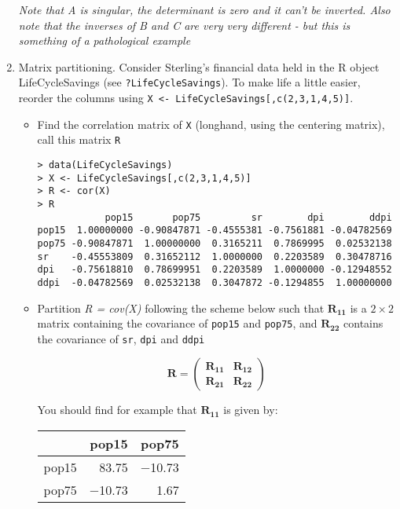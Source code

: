 \documentclass{article}
\begin{document}
\begin{enumerate}
\textit{Note that A is singular, the determinant is zero and it can't be inverted.   Also note that the inverses of B and C are very very different - but this is something of a pathological example}


\item Matrix partitioning.   Consider Sterling's financial data held in the R object LifeCycleSavings (see \texttt{?LifeCycleSavings}).   To make life a little easier, reorder the columns using \texttt{X <- LifeCycleSavings[,c(2,3,1,4,5)]}.

\begin{itemize}
\item Find the correlation matrix of \texttt{X} (longhand, using the centering matrix), call this matrix \texttt{R}

\begin{verbatim}
> data(LifeCycleSavings)
> X <- LifeCycleSavings[,c(2,3,1,4,5)]
> R <- cor(X)
> R
            pop15       pop75         sr        dpi        ddpi
pop15  1.00000000 -0.90847871 -0.4555381 -0.7561881 -0.04782569
pop75 -0.90847871  1.00000000  0.3165211  0.7869995  0.02532138
sr    -0.45553809  0.31652112  1.0000000  0.2203589  0.30478716
dpi   -0.75618810  0.78699951  0.2203589  1.0000000 -0.12948552
ddpi  -0.04782569  0.02532138  0.3047872 -0.1294855  1.00000000
\end{verbatim}

\item Partition \textit{R = cov(X)} following the scheme below such that $\boldsymbol{R_{11}}$ is a $2 \times 2$ matrix containing the covariance of \texttt{pop15} and \texttt{pop75}, and $\boldsymbol{R_{22}}$ contains the covariance of \texttt{sr}, \texttt{dpi} and \texttt{ddpi}

\begin{displaymath}
\boldsymbol{R} = \left( \begin{array}{l|l} \boldsymbol{R_{11}} & \boldsymbol{R_{12}} \\ \hline    \boldsymbol{R_{21}} & \boldsymbol{R_{22}} \end{array} \right) 
\end{displaymath}

You should find for example that  $\boldsymbol{R_{11}}$ is given by:
\begin{table}[ht]
\begin{center}
\begin{tabular}{rrr}
\hline
 & pop15 & pop75 \\
\hline
pop15 & 83.75 & $-$10.73 \\
pop75 & $-$10.73 & 1.67 \\
\hline
\end{tabular}
\end{center}
\end{table}


\end{itemize}
\end{enumerate}
\end{document}
